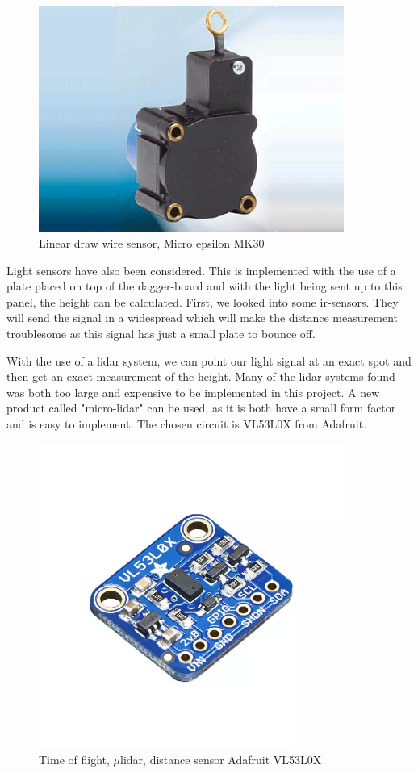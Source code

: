 \begin{figure}[H]%
\begin{center}
	\includegraphics[width = 10cm]{Figures/microepsilon_mk30.png}
	\caption{Linear draw wire sensor, Micro epsilon MK30}
	\label{Draw_sensor}
\end{center}
\end{figure}

Light sensors have also been considered. This is implemented with the use of a plate placed on top of the dagger-board and with the light being sent up to this panel, the height can be calculated. First, we looked into some \gls{ir}-sensors. They will send the signal in a widespread which will make the distance measurement troublesome as this signal has just a small plate to bounce off.

With the use of a \gls{lidar} system, we can point our light signal at an exact spot and then get an exact measurement of the height.  
Many of the \gls{lidar} systems found was both too large and expensive to be implemented in this project.
A new product called "micro-lidar" can be used, as it is both have a small form factor and is easy to implement.
The chosen circuit is VL53L0X from Adafruit\cite{micro_lidar}. 

\begin{figure}[H]
	\includegraphics[width = 10cm]{Figures/Adafruit_height_sensor.png}
	\caption{Time of flight, $\mu$\gls{lidar}, distance sensor Adafruit VL53L0X}
	\label{micro_lidar}
\end{figure}

